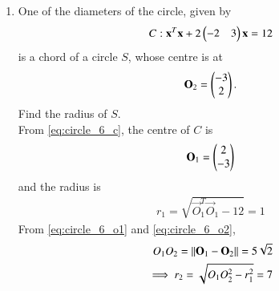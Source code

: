 \documentclass[journal,12pt,twocolumn]{IEEEtran}
\begin{document}
\begin{enumerate}[label=\arabic*]
%
%
\item One of the diameters of the circle, given by 
\begin{equation}
C: \mathbf{x}^T\mathbf{x} +2\begin{pmatrix}-2 & 3 \end{pmatrix}\mathbf{x} = 12
\label{eq:circle_6_c}
\end{equation}
is a chord of a circle $S$, whose centre is at 
\begin{equation}
\mathbf{O}_2=\begin{pmatrix}-3\\ 2\end{pmatrix}.
\label{eq:circle_6_o2}
\end{equation}
Find the radius of $S$.
\\
\solution From \eqref{eq:circle_6_c}, the centre of $C$ is 
\begin{align}
\mathbf{O}_1 = \begin{pmatrix}2\\ -3\end{pmatrix} 
\label{eq:circle_6_o1}
\end{align}
%
and the radius is 
\begin{align}
r_1 = \sqrt{\vec{O}_1^T\vec{O}_1-12} = 1
\label{eq:circle_6_r1}
\end{align}
%
From \eqref{eq:circle_6_o1} and \eqref{eq:circle_6_o2},
\begin{align}
O_1O_2 = \left\Vert\mathbf{O}_1-\mathbf{O}_2\right\Vert=5\sqrt{2}
\nonumber \\
\label{eq:circle_6_o1o2}
\implies r_2 = \sqrt{O_1O_2^2-r_1^2} = 7
\end{align}


\end{enumerate}
\end{document}
